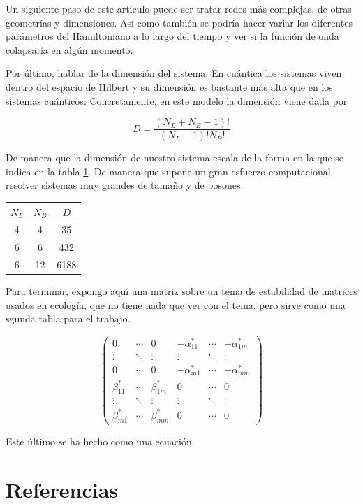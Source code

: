 \documentclass[11pt,a4paper]{article}
\begin{document}
Un siguiente paso de este artículo puede ser tratar redes más complejas, de otras geometrías y dimensiones. Así como también se podría hacer variar los diferentes parámetros del Hamiltoniano a lo largo del tiempo y ver si la función de onda colapsaría en algún momento.

Por último, hablar de la dimensión del sistema. En cuántica los sistemas viven dentro del espacio de Hilbert y su dimensión es bastante más alta que en los sistemas cuánticos. Concretamente, en este modelo la dimensión viene dada por

\begin{equation}
  D=\frac{(N_L+N_B-1)!}{(N_L-1)!N_B!}
\end{equation}

De manera que la dimensión de nuestro sistema escala de la forma en la que se indica en la tabla \ref{t:dimension}. De manera que supone un gran esfuerzo computacional resolver sistemas muy grandes de tamaño y de bosones.


\begin{table}[h]
  \centering
  
  \begin{tabular}{|c||c||c|}
    
    \hline
    $N_L$ & $N_B$ & $D$ \\
    \hline
    4 & 4 & 35 \\
    \hline
    6 & 6 & 432 \\
    \hline
    6 & 12 & 6188 \\
    \hline
  \end{tabular}
  \label{t:dimension}
\end{table}


Para terminar, expongo aquí una matriz sobre un tema de estabilidad de matrices usados en ecología, que no tiene nada que ver con el tema, pero sirve como una sgunda tabla para el trabajo.

\begin{equation}
  \left(
  \begin{array}{cccccc}
    0 & \cdots & 0 & -\alpha_{11}^* & \cdots & -\alpha_{1m}^* \\
    \vdots & \ddots & \vdots & \vdots & \ddots & \vdots \\
    0 & \cdots & 0 & -\alpha_{m1}^* & \cdots & -\alpha_{mm}^* \\
    \beta_{11}^* & \cdots & \beta_{1m}^* & 0 & \cdots & 0 \\
    \vdots & \ddots & \vdots & \vdots & \ddots & \vdots \\
    \beta_{m1}^* & \cdots & \beta_{mm}^* & 0 & \cdots & 0 
  \end{array}
  \right)
\end{equation}

Este último se ha hecho como una ecuación.



 \section{Referencias}




\nocite{Smith}
\nocite{Galindo}
\nocite{Sakurai}
\nocite{Laser}
\nocite{Ashcroft}
\nocite{Caos}
\nocite{Yo}
\end{document}
